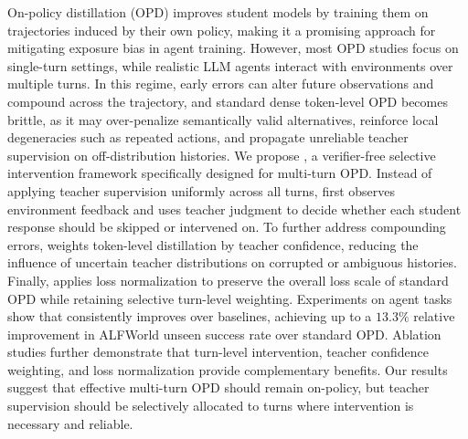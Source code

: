 On-policy distillation (OPD) improves student models by training them on trajectories induced by their own policy, making it a promising approach for mitigating exposure bias in agent training.
%
However, most OPD studies focus on single-turn settings, while realistic LLM agents interact with environments over multiple turns.
%
In this regime, early errors can alter future observations and compound across the trajectory, and standard dense token-level OPD becomes brittle, as it may over-penalize semantically valid alternatives, reinforce local degeneracies such as repeated actions, and propagate unreliable teacher supervision on off-distribution histories.
%
We propose \textbf{\ours}, a verifier-free selective intervention framework specifically designed for multi-turn OPD.
%
Instead of applying teacher supervision uniformly across all turns, \ours first observes environment feedback and uses teacher judgment to decide whether each student response should be skipped or intervened on.
%
To further address compounding errors, \ours weights token-level distillation by teacher confidence, reducing the influence of uncertain teacher distributions on corrupted or ambiguous histories.
%
Finally, \ours applies loss normalization to preserve the overall loss scale of standard OPD while retaining selective turn-level weighting.
%
Experiments on agent tasks show that \ours consistently improves over baselines, achieving up to a $13.3\%$ relative improvement in ALFWorld unseen success rate over standard OPD.
%
Ablation studies further demonstrate that turn-level intervention, teacher confidence weighting, and loss normalization provide complementary benefits.
%
Our results suggest that effective multi-turn OPD should remain on-policy, but teacher supervision should be selectively allocated to turns where intervention is necessary and reliable.
%
